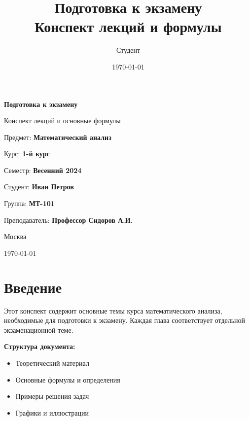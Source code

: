 \documentclass[12pt,a4paper]{report}
\title{\textbf{Подготовка к экзамену}\\\large Конспект лекций и формулы}
\author{Студент}
\date{\today}
\begin{document}
\begin{titlepage}
\centering
\vspace*{2cm}

{\huge\bfseries Подготовка к экзамену\par}
\vspace{1cm}
{\Large Конспект лекций и основные формулы\par}
\vspace{2cm}

{\large Предмет: \textbf{Математический анализ}\par}
\vspace{0.5cm}
{\large Курс: \textbf{1-й курс}\par}
\vspace{0.5cm}
{\large Семестр: \textbf{Весенний 2024}\par}

\vspace{3cm}

{\Large Студент: \textbf{Иван Петров}\par}
\vspace{0.5cm}
{\large Группа: \textbf{МТ-101}\par}
\vspace{0.5cm}
{\large Преподаватель: \textbf{Профессор Сидоров А.И.}\par}

\vfill

{\large Москва\par}
{\large \today\par}
\end{titlepage}

\tableofcontents
\newpage

\chapter*{Введение}

Этот конспект содержит основные темы курса математического анализа, необходимые для подготовки к экзамену. Каждая глава соответствует отдельной экзаменационной теме.

\textbf{Структура документа:}
\begin{itemize}
    \item Теоретический материал
    \item Основные формулы и определения
    \item Примеры решения задач
    \item Графики и иллюстрации
\end{itemize}
\end{document}
